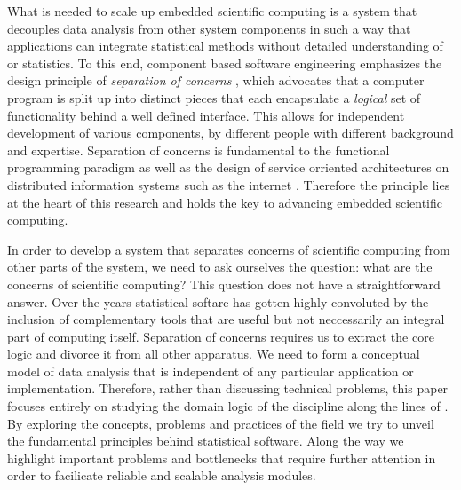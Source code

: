 What is needed to scale up embedded scientific computing is a system that decouples data analysis from other system components in such a way that applications can integrate statistical methods without detailed understanding of \R or statistics. To this end, component based software engineering emphasizes the design principle of \emph{separation of concerns} \citep{heineman2001component}, which advocates that a computer program is split up into distinct pieces that each encapsulate a \emph{logical} set of functionality behind a well defined interface. This allows for independent development of various components, by different people with different background and expertise. Separation of concerns is fundamental to the functional programming paradigm \citep{reade1989elements} as well as the design of service orriented architectures on distributed information systems such as the internet \citep{fielding2000architectural}. Therefore the principle lies at the heart of this research and holds the key to advancing embedded scientific computing.

In order to develop a system that separates concerns of scientific computing from other parts of the system, we need to ask ourselves the question: what are the concerns of scientific computing? This question does not have a straightforward answer. Over the years statistical softare has gotten highly convoluted by the inclusion of complementary tools that are useful but not neccessarily an integral part of computing itself. Separation of concerns requires us to extract the core logic and divorce it from all other apparatus. We need to form a conceptual model of data analysis that is independent of any particular application or implementation. Therefore, rather than discussing technical problems, this paper focuses entirely on studying the domain logic of the discipline along the lines of \cite{evans2004domain}. By exploring the concepts, problems and practices of the field we try to unveil the fundamental principles behind statistical software. Along the way we highlight important problems and bottlenecks that require further attention in order to facilicate reliable and scalable analysis modules.

